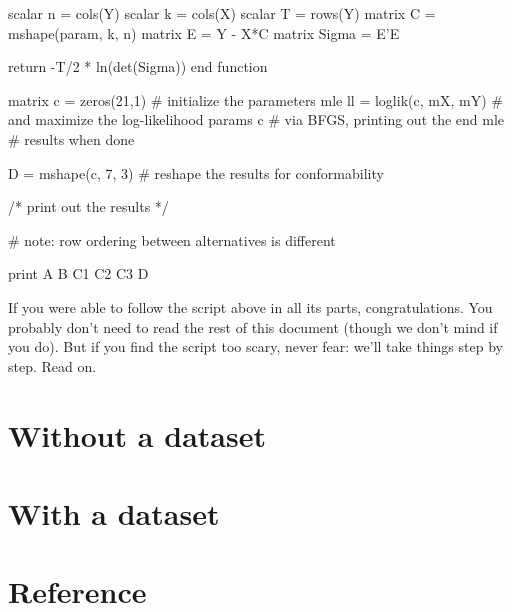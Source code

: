 \documentclass[oneside]{book}
\begin{document}
\begin{scode}
    scalar n = cols(Y)
    scalar k = cols(X)
    scalar T = rows(Y)
    matrix C = mshape(param, k, n)
    matrix E = Y - X*C
    matrix Sigma = E'E

    return -T/2 * ln(det(Sigma))
end function

matrix c = zeros(21,1)                  # initialize the parameters
mle ll = loglik(c, mX, mY)              # and maximize the log-likelihood
    params c                            # via BFGS, printing out the
end mle                                 # results when done

D = mshape(c, 7, 3)                     # reshape the results for conformability

/* print out the results */

# note: row ordering between alternatives is different 

print A B C1 C2 C3 D
\end{scode}

If you were able to follow the script above in all its parts,
congratulations. You probably don't need to read the rest of this
document (though we don't mind if you do). But if you find the script
too scary, never fear: we'll take things step by step. Read on.

\part{Without a dataset}
\label{part:hp-nodata}








\part{With a dataset}
\label{part:hp-data}




\part{Reference}
\label{part:hp-reference}




% 

% 
\end{document}
